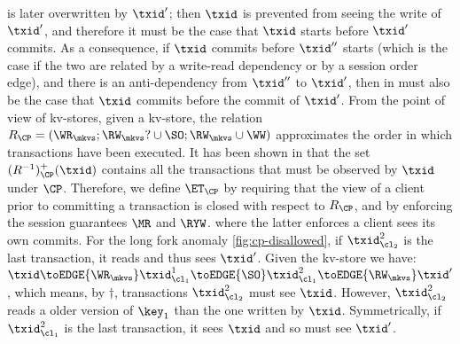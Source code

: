is later overwritten by $\txid'$; then $\txid$ is prevented from seeing the write of $\txid'$, 
and therefore it {must} be the case that $\txid$ starts before 
$\txid'$ commits. 
As a consequence, if $\txid$ commits before $\txid''$ starts (which is the case if the two are 
related by a write-read dependency or by a session order edge), and there is an anti-dependency 
from $\txid''$ to $\txid'$, then in {must} also be the case that $\txid$ commits before 
the commit of $\txid'$.
From the point of view of kv-stores, given a kv-store, the relation $R_{\CP} = (\WR_{\mkvs}; \RW_{\mkvs}? \cup \SO;  \RW_{\mkvs} \cup \WW)$ 
approximates the order in which transactions have been executed. It has been shown in \cite{laws} 
that the set $(R^{-1})^{+}_{\CP}(\txid)$ contains all the transactions that {must} be observed by $\txid$ under 
$\CP$. Therefore, we define $\ET_{\CP}$ by requiring that the view of a client prior to committing a transaction is 
closed with respect to $R_{\CP}$, and by enforcing the session guarantees $\MR$ and $\RYW$.
where the latter enforces a client sees its own commits.
For the long fork anomaly \cref{fig:cp-disallowed},
if \( \txid_{\cl_2}^2\) is the last transaction, it reads and thus sees \( \txid' \).
Given the kv-store we have:
\(
\txid \toEDGE{\WR_\mkvs} \txid^1_{\cl_1} \toEDGE{\SO} \txid^2_{\cl_1} \toEDGE{\RW_\mkvs} \txid'
\),
which means, by \( \dagger \), transactions \( \txid_{\cl_2}^2 \) must see \( \txid \).
However, \(  \txid_{\cl_2}^2 \) reads a older version of \( \key_1 \) than the one written by \( \txid \).
Symmetrically,
if \( \txid_{\cl_1}^2\) is the last transaction, it sees \( \txid \) and so must see \( \txid' \).



